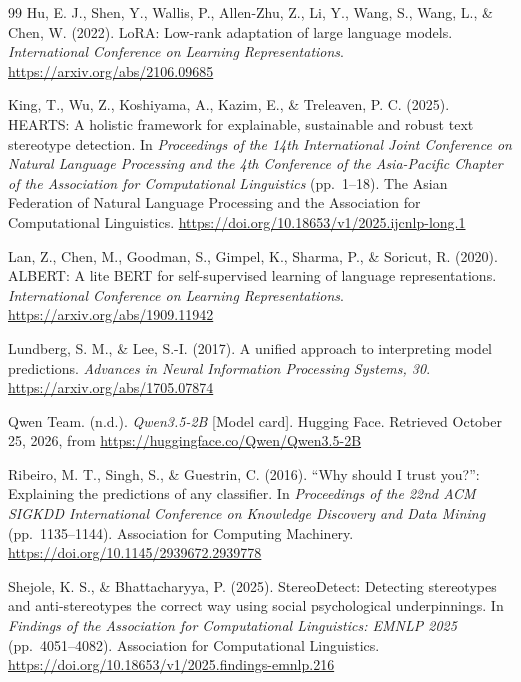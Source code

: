\begin{thebibliography}{99}
\setlength{\itemsep}{6pt}
\setlength{\parskip}{0pt}
Hu, E. J., Shen, Y., Wallis, P., Allen-Zhu, Z., Li, Y., Wang, S., Wang, L., \& Chen, W. (2022).
LoRA: Low-rank adaptation of large language models.
\textit{International Conference on Learning Representations}.
\url{https://arxiv.org/abs/2106.09685}

King, T., Wu, Z., Koshiyama, A., Kazim, E., \& Treleaven, P. C. (2025).
HEARTS: A holistic framework for explainable, sustainable and robust text stereotype detection.
In \textit{Proceedings of the 14th International Joint Conference on Natural Language Processing and the 4th Conference of the Asia-Pacific Chapter of the Association for Computational Linguistics} (pp.\ 1--18).
The Asian Federation of Natural Language Processing and the Association for Computational Linguistics.
\url{https://doi.org/10.18653/v1/2025.ijcnlp-long.1}

Lan, Z., Chen, M., Goodman, S., Gimpel, K., Sharma, P., \& Soricut, R. (2020).
ALBERT: A lite BERT for self-supervised learning of language representations.
\textit{International Conference on Learning Representations}.
\url{https://arxiv.org/abs/1909.11942}

Lundberg, S. M., \& Lee, S.-I. (2017).
A unified approach to interpreting model predictions.
\textit{Advances in Neural Information Processing Systems, 30}.
\url{https://arxiv.org/abs/1705.07874}

Qwen Team. (n.d.).
\textit{Qwen3.5-2B} [Model card]. Hugging Face.
Retrieved October 25, 2026, from \url{https://huggingface.co/Qwen/Qwen3.5-2B}

Ribeiro, M. T., Singh, S., \& Guestrin, C. (2016).
``Why should I trust you?'': Explaining the predictions of any classifier.
In \textit{Proceedings of the 22nd ACM SIGKDD International Conference on Knowledge Discovery and Data Mining} (pp.\ 1135--1144).
Association for Computing Machinery.
\url{https://doi.org/10.1145/2939672.2939778}

Shejole, K. S., \& Bhattacharyya, P. (2025).
StereoDetect: Detecting stereotypes and anti-stereotypes the correct way using social psychological underpinnings.
In \textit{Findings of the Association for Computational Linguistics: EMNLP 2025} (pp.\ 4051--4082).
Association for Computational Linguistics.
\url{https://doi.org/10.18653/v1/2025.findings-emnlp.216}


\end{thebibliography}
